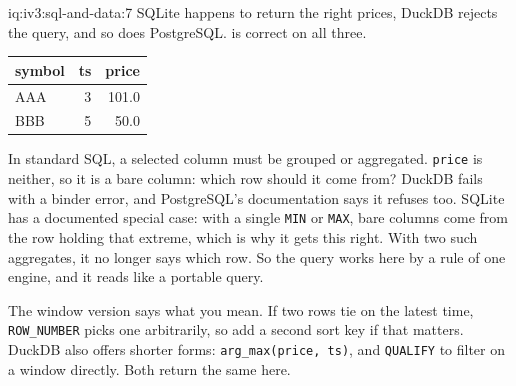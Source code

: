 \begin{solution}{iq:iv3:sql-and-data:7}
SQLite happens to return the right prices, DuckDB rejects the query, and so does PostgreSQL.  is correct on all three.
\label{lst:iv3:sq:latest}
\begin{center}\small
\begin{tabular}{lrr}
symbol & ts & price\\\hline
AAA & 3 & 101.0\\
BBB & 5 & 50.0
\end{tabular}
\end{center}
In standard SQL, a selected column must be grouped or aggregated. \texttt{price} is neither, so it is a bare column: which row should it come from? DuckDB fails with a binder error, and PostgreSQL's documentation says it refuses too. SQLite has a documented special case: with a single \texttt{MIN} or \texttt{MAX}, bare columns come from the row holding that extreme, which is why it gets this right. With two such aggregates, it no longer says which row. So the query works here by a rule of one engine, and it reads like a portable query.

The window version says what you mean. If two rows tie on the latest time, \texttt{ROW\_NUMBER} picks one arbitrarily, so add a second sort key if that matters. DuckDB also offers shorter forms: \texttt{arg\_max(price, ts)}, and \texttt{QUALIFY} to filter on a window directly. Both return the same here.

\end{solution}

